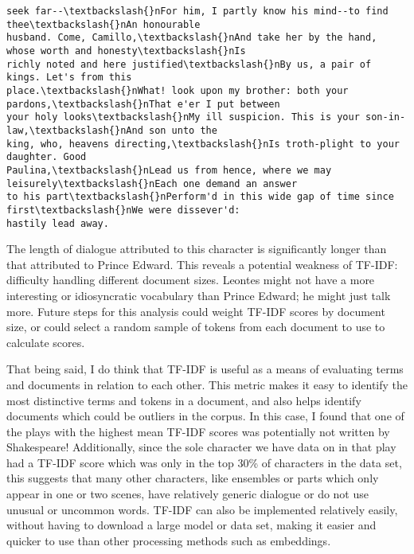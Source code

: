 \documentclass[11pt]{article}
\begin{document}
\begin{tcolorbox}[breakable, size=fbox, boxrule=.5pt, pad at break*=1mm, opacityfill=0]
\begin{Verbatim}[commandchars=\\\{\}]
seek far--\textbackslash{}nFor him, I partly know his mind--to find thee\textbackslash{}nAn honourable
husband. Come, Camillo,\textbackslash{}nAnd take her by the hand, whose worth and honesty\textbackslash{}nIs
richly noted and here justified\textbackslash{}nBy us, a pair of kings. Let's from this
place.\textbackslash{}nWhat! look upon my brother: both your pardons,\textbackslash{}nThat e'er I put between
your holy looks\textbackslash{}nMy ill suspicion. This is your son-in-law,\textbackslash{}nAnd son unto the
king, who, heavens directing,\textbackslash{}nIs troth-plight to your daughter. Good
Paulina,\textbackslash{}nLead us from hence, where we may leisurely\textbackslash{}nEach one demand an answer
to his part\textbackslash{}nPerform'd in this wide gap of time since first\textbackslash{}nWe were dissever'd:
hastily lead away.
\end{Verbatim}
\end{tcolorbox}
        
    The length of dialogue attributed to this character is significantly
longer than that attributed to Prince Edward. This reveals a potential
weakness of TF-IDF: difficulty handling different document sizes.
Leontes might not have a more interesting or idiosyncratic vocabulary
than Prince Edward; he might just talk more. Future steps for this
analysis could weight TF-IDF scores by document size, or could select a
random sample of tokens from each document to use to calculate scores.

That being said, I do think that TF-IDF is useful as a means of
evaluating terms and documents in relation to each other. This metric
makes it easy to identify the most distinctive terms and tokens in a
document, and also helps identify documents which could be outliers in
the corpus. In this case, I found that one of the plays with the highest
mean TF-IDF scores was potentially not written by Shakespeare!
Additionally, since the sole character we have data on in that play had
a TF-IDF score which was only in the top 30\% of characters in the data
set, this suggests that many other characters, like ensembles or parts
which only appear in one or two scenes, have relatively generic dialogue
or do not use unusual or uncommon words. TF-IDF can also be implemented
relatively easily, without having to download a large model or data set,
making it easier and quicker to use than other processing methods such
as embeddings.


    
    
    
\end{document}
